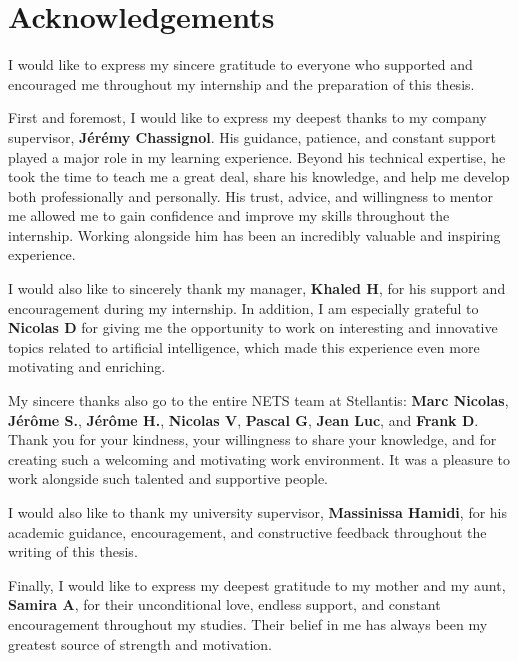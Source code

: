 \documentclass[11pt,a4paper]{report}
\begin{document}
\chapter*{Acknowledgements}

I would like to express my sincere gratitude to everyone who supported and encouraged me throughout my internship and the preparation of this thesis.

First and foremost, I would like to express my deepest thanks to my company supervisor, \textbf{Jérémy Chassignol}. His guidance, patience, and constant support played a major role in my learning experience. Beyond his technical expertise, he took the time to teach me a great deal, share his knowledge, and help me develop both professionally and personally. His trust, advice, and willingness to mentor me allowed me to gain confidence and improve my skills throughout the internship. Working alongside him has been an incredibly valuable and inspiring experience.

I would also like to sincerely thank my manager, \textbf{Khaled H}, for his support and encouragement during my internship. In addition, I am especially grateful to \textbf{Nicolas D} for giving me the opportunity to work on interesting and innovative topics related to artificial intelligence, which made this experience even more motivating and enriching.

My sincere thanks also go to the entire NETS team at Stellantis: \textbf{Marc Nicolas}, \textbf{Jérôme S.}, \textbf{Jérôme H.}, \textbf{Nicolas V}, \textbf{Pascal G}, \textbf{Jean Luc}, and \textbf{Frank D}. Thank you for your kindness, your willingness to share your knowledge, and for creating such a welcoming and motivating work environment. It was a pleasure to work alongside such talented and supportive people.

I would also like to thank my university supervisor, \textbf{Massinissa Hamidi}, for his academic guidance, encouragement, and constructive feedback throughout the writing of this thesis.

Finally, I would like to express my deepest gratitude to my mother and my aunt, \textbf{Samira A}, for their unconditional love, endless support, and constant encouragement throughout my studies. Their belief in me has always been my greatest source of strength and motivation.

\tableofcontents
\clearpage

\listoffigures
\clearpage
\end{document}
